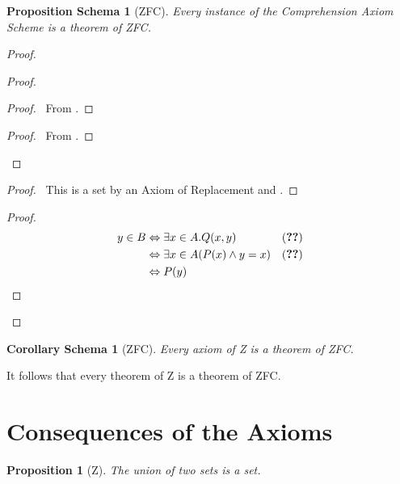 \documentclass{book}
\let\qed\relax
\newtheorem{prop}[ax]{Proposition}
\newtheorem{props}[ax]{Proposition Schema}
\newtheorem{cors}{Corollary Schema}[ax]
\theoremstyle{definition}
\begin{document}
\begin{props}[ZFC]
Every instance of the Comprehension Axiom Scheme is a theorem of ZFC.
\end{props}

\begin{proof}
\pf
{}
\begin{proof}
	\begin{proof}
		\pf\ From .
	\end{proof}
	\begin{proof}
		\pf\ From .
	\end{proof}
\end{proof}
\begin{proof}
	\pf\ This is a set by an Axiom of Replacement and .
\end{proof}
\begin{proof}
	\pf
	\begin{align*}
		y \in B & \Leftrightarrow \exists x \in A. Q(x,y) & (\text{\stepref{4}}) \\
		& \Leftrightarrow \exists x \in A (P(x) \wedge y = x) & (\text{\stepref{2}}) \\
		& \Leftrightarrow P(y)
	\end{align*}
\end{proof}
\qed
\end{proof}

\begin{cors}[ZFC]
Every axiom of Z is a theorem of ZFC.
\end{cors}

It follows that every theorem of Z is a theorem of ZFC.

\section{Consequences of the Axioms}

\begin{prop}[Z]
The union of two sets is a set.
\end{prop}
\end{document}
